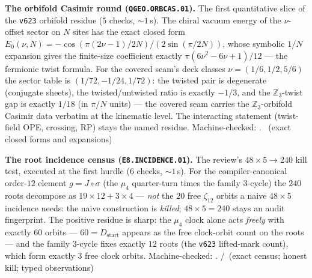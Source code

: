 \par\smallskip\noindent\textbf{The orbifold Casimir round
(\texttt{QGEO.ORBCAS.01}).}
The first quantitative slice of the \texttt{v623} orbifold residue
($5$ checks, ${\sim}1$\,s).  The chiral vacuum energy of the
$\nu$-offset sector on $N$ sites has the exact closed form
$E_0(\nu,N)=-\cos(\pi(2\nu{-}1)/2N)/(2\sin(\pi/2N))$, whose symbolic
$1/N$ expansion gives the finite-size coefficient exactly
$\pi(6\nu^2{-}6\nu{+}1)/12$ --- the fermionic twist formula.  For the
covered seam's deck classes $\nu=(1/6,1/2,5/6)$ the sector table is
$(1/72,-1/24,1/72)$: the twisted pair is degenerate (conjugate
sheets), the twisted/untwisted ratio is exactly $-1/3$, and the
$\mathbb Z_3$-twist gap is exactly $1/18$ (in $\pi/N$ units) --- the
covered seam carries the $\mathbb Z_3$-orbifold Casimir data
verbatim at the kinematic level.  The interacting statement
(twist-field OPE, crossing, RP) stays the named residue.
Machine-checked: .
\mE\ (exact closed forms and expansions)
\par\smallskip

\par\smallskip\noindent\textbf{The root incidence census
(\texttt{E8.INCIDENCE.01}).}
The review's $48\times5\to240$ kill test, executed at the first hurdle
($6$ checks, ${\sim}1$\,s).  For the compiler-canonical order-$12$
element $g=J\circ\sigma$ (the $\mu_4$ quarter-turn times the family
$3$-cycle) the $240$ roots decompose as $19\times12+3\times4$ ---
\emph{not} the $20$ free $\zeta_{12}$ orbits a naive
$48\times5$ incidence needs: the naive construction is
\emph{killed}; $48\times5=240$ stays an audit fingerprint.  The
positive residue is sharp: the $\mu_4$ clock alone acts \emph{freely}
with exactly $60$ orbits --- $60=D_{\mathrm{start}}$ appears as the
free clock-orbit count on the roots --- and the family $3$-cycle fixes
exactly $12$ roots (the \texttt{v623} lifted-mark count), which form
exactly $3$ free clock orbits.
Machine-checked: .
\mE/\mC\ (exact census; honest kill; typed observations)
\par\smallskip

